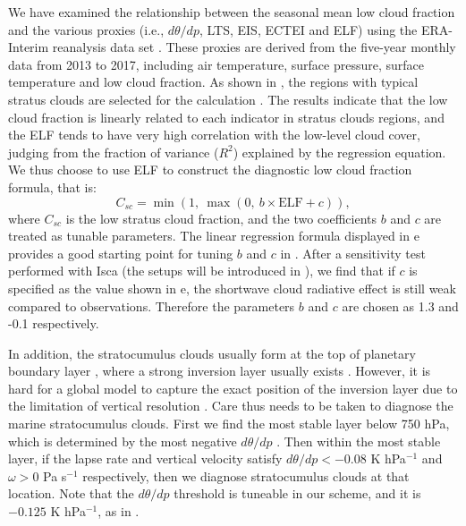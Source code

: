 We have examined the relationship between the seasonal mean low cloud fraction and the various proxies (i.e., $d\theta/dp$, LTS, EIS, ECTEI and ELF) using the ERA-Interim reanalysis data set \citep{Dee2011}. These proxies are derived from the five-year monthly data from 2013 to 2017, including air temperature, surface pressure, surface temperature and low cloud fraction. As shown in , the regions with typical stratus clouds are selected for the calculation \citep{Klein1993}. The results indicate that the low cloud fraction is linearly related to each indicator in stratus clouds regions, and the ELF tends to have very high correlation with the low-level cloud cover, judging from the fraction of variance ($R^2$) explained by the regression equation. We thus choose to use ELF to construct the diagnostic low cloud fraction formula, that is:
\begin{equation}
	C_{sc} = \min(1, ~\max(0, ~b\times \text{ELF} + c)),
	\label{eq:sc_ELF}
\end{equation}
where $C_{sc}$ is the low stratus cloud fraction, and the two coefficients $b$ and $c$ are treated as tunable parameters. The linear regression formula displayed in e provides a good starting point for tuning $b$ and $c$ in . After a sensitivity test performed with Isca (the setups will be introduced in ), we find that if $c$ is specified as the value shown in e, the shortwave cloud radiative effect is still weak compared to observations. Therefore the parameters $b$ and $c$ are chosen as 1.3 and -0.1 respectively.

In addition, the stratocumulus clouds usually form at the top of planetary boundary layer \citep{Wood2012}, where a strong inversion layer usually exists \citep{Wood2006,Park2019}. However, it is hard for a global model to capture the exact position of the inversion layer due to the limitation of vertical resolution \citep{Kawai2019}. Care thus needs to be taken to diagnose the marine stratocumulus clouds. First we find the most stable layer below 750 hPa, which is determined by the most negative $d\theta/dp$ \citep{Slingo1987}. Then within the most stable layer, if the lapse rate and vertical velocity satisfy $d\theta/dp<-0.08$ K hPa$^{-1}$ and $\omega>0$ Pa s$^{-1}$ respectively, then we diagnose stratocumulus clouds at that location. Note that the $d\theta/dp$ threshold is tuneable in our scheme, and it is $-0.125$ K hPa$^{-1}$, as in \citet{Collins2004}.

